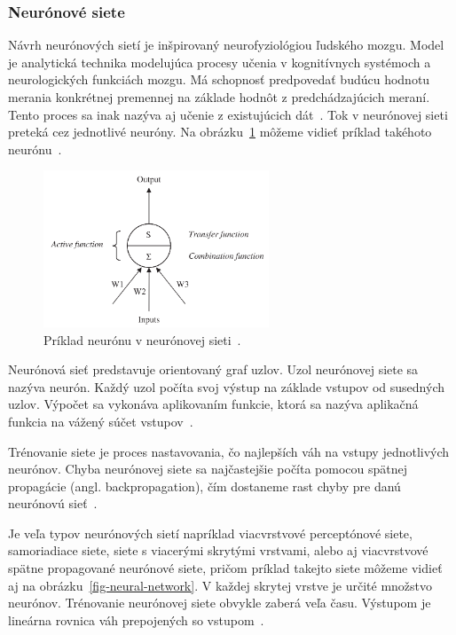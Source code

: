 \documentclass[a4paper,slovak,12pt,appendix]{article}
\begin{document}

\subsubsection{Neurónové siete}
Návrh neurónových sietí je inšpirovaný neurofyziológiou ľudského mozgu. Model
je analytická technika modelujúca procesy učenia v kognitívnych systémoch
a neurologických funkciách mozgu. Má schopnosť predpovedať budúcu hodnotu
merania konkrétnej premennej na základe hodnôt z predchádzajúcich meraní. Tento
proces sa inak nazýva aj učenie z existujúcich dát~\cite{Tso2007}.
Tok v neurónovej sieti preteká cez jednotlivé neuróny. Na obrázku~\ref{fig-neuron}
môžeme vidieť príklad takéhoto neurónu~\cite{Tso2007}.

\begin{figure}[!ht]
  \centering
	\captionsetup{justification=centering}
  \includegraphics[width=0.6\textwidth]{neuron.png}
  \caption[Príklad neurónu v neurónovej sieti.]{Príklad neurónu v neurónovej sieti~\cite{Tso2007}.}
  \label{fig-neuron}
\end{figure}

\noindent
Neurónová sieť predstavuje orientovaný graf uzlov. Uzol neurónovej
siete sa nazýva neurón. Každý uzol počíta svoj výstup na základe vstupov od
susedných uzlov. Výpočet sa vykonáva aplikovaním funkcie, ktorá sa nazýva
aplikačná funkcia na vážený súčet vstupov~\cite{Gruau1994}.

Trénovanie siete je proces nastavovania, čo najlepších váh na vstupy
jednotlivých neurónov. Chyba neurónovej siete sa najčastejšie počíta pomocou
spätnej propagácie (angl. backpropagation), čím dostaneme rast chyby pre danú
neurónovú sieť~\cite{Tso2007}.

Je veľa typov neurónových sietí napríklad viacvrstvové perceptónové siete,
samoriadiace siete, siete s viacerými skrytými vrstvami, alebo aj viacvrstvové
spätne propagované neurónové siete, pričom príklad takejto siete môžeme vidieť
aj na obrázku~\ref{fig-neural-network}. V každej skrytej vrstve je určité množstvo
neurónov. Trénovanie neurónovej siete obvykle zaberá veľa času. Výstupom je
lineárna rovnica váh prepojených so vstupom~\cite{KumarSingh2013}.
\end{document}
